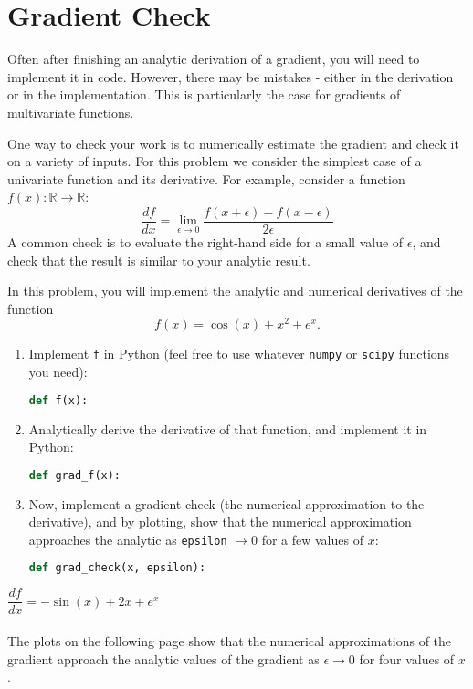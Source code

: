 \documentclass[submit]{harvardml}
\begin{document}
\section*{Gradient Check}
\begin{problem}
  Often after finishing an analytic derivation of a gradient, you will
  need to implement it in code.  However, there may be mistakes -
  either in the derivation or in the implementation. This is
  particularly the case for gradients of multivariate functions.

  \air

  \noindent One way to check your work is to numerically estimate the gradient
  and check it on a variety of inputs. For this problem we consider
  the simplest case of a univariate function and its derivative.  For
  example, consider a function $f(x): \mathbb{R} \to \mathbb{R}$:
$$\frac{d f}{d x} = \underset{\epsilon \to 0} \lim \frac{f(x + \epsilon) - f(x - \epsilon)}{2 \epsilon}$$
\noindent A common check is to evaluate the right-hand side for a small value of
$\epsilon$, and check that the result is similar to your analytic
result.\\

\smallskip

\noindent In this problem, you will implement the analytic and numerical derivatives of the function \[f(x) = \cos(x) + x^2 + e^x.\]

\begin{enumerate}
  \item Implement \texttt{f} in Python (feel free to use whatever \texttt{numpy} or \texttt{scipy} functions you need):
  \begin{lstlisting}[language=python]
  def f(x):

  \end{lstlisting}
  \item Analytically derive the derivative of that function, and implement it in Python:
  \begin{lstlisting}[language=python]
  def grad_f(x):

  \end{lstlisting}
  \item Now, implement a gradient check (the numerical approximation to the derivative), and by plotting, 
        show that the numerical approximation approaches the analytic as \texttt{epsilon} 
        $\to 0$ for a few values of $x$:
  \begin{lstlisting}[language=python]
  def grad_check(x, epsilon):

  \end{lstlisting}
\end{enumerate}
\end{problem}
$\dfrac{df}{dx}=-\sin{(x)} + 2x + e^{x}$\\\\
The plots on the following page show that the numerical approximations of the gradient approach the analytic values of the gradient as $\epsilon \rightarrow 0$ for four values of $x$.
\end{document}
